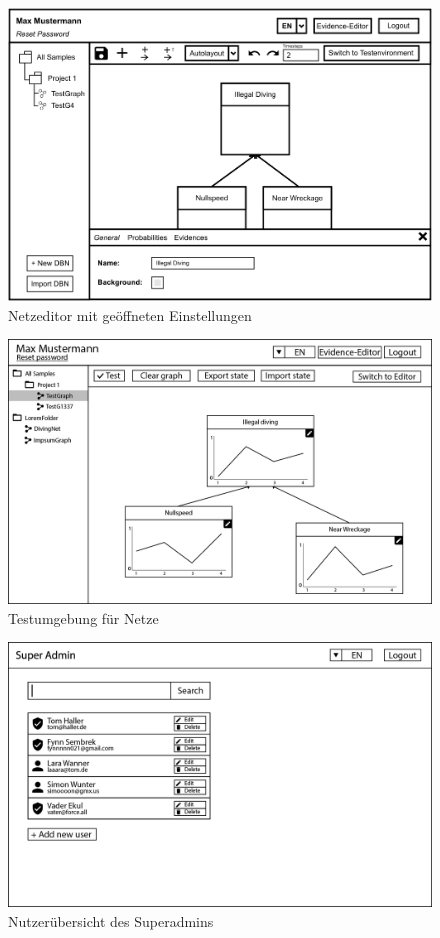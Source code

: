 \documentclass[parskip=full,11pt,twoside]{scrartcl}
\begin{document}
\begin{figure}[ht!]
  \includegraphics[width=\linewidth]{image/editor_properties.png}
  \caption{Netzeditor mit geöffneten Einstellungen}
  \label{fig:neteditorproperties}
\end{figure}

\begin{figure}[ht!]
  \includegraphics[width=\linewidth]{image/GUI-4.png}
  \caption{Testumgebung für Netze}
  \label{fig:testEdit}
\end{figure}

\begin{figure}[ht!]
  \includegraphics[width=\linewidth]{image/GUI-1.png}
  \caption{Nutzerübersicht des Superadmins}
  \label{fig:saUserview}
\end{figure}
\end{document}
